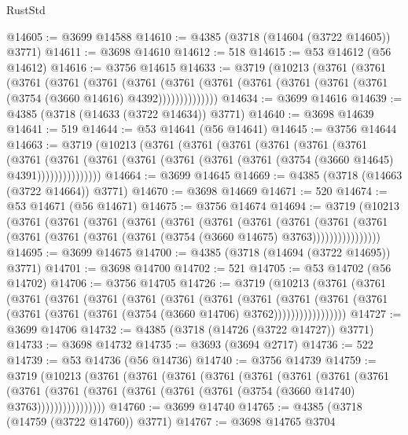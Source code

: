 \begin{lexlean}{RustStd}
\begin{coremodule}
{\begin{coremodule}
{{{{{{{{{{{{{{{{{{{{{{{{{{{{{{{{{{{{{{{{{{{{{{{@14605 := @3699 @14588
@14610 := @4385 (@3718 (@14604 (@3722 @14605)) @3771)
@14611 := @3698 @14610
@14612 := 518
@14615 := @53 @14612 (@56 @14612)
@14616 := @3756 @14615
@14633 := @3719
    (@10213
      (@3761
        (@3761
          (@3761
            (@3761
              (@3761
                (@3761
                  (@3761
                    (@3761 (@3761 (@3761 (@3761 (@3761 (@3754 (@3660 @14616) @4392))))))))))))))
@14634 := @3699 @14616
@14639 := @4385 (@3718 (@14633 (@3722 @14634)) @3771)
@14640 := @3698 @14639
@14641 := 519
@14644 := @53 @14641 (@56 @14641)
@14645 := @3756 @14644
@14663 := @3719
    (@10213
      (@3761
        (@3761
          (@3761
            (@3761
              (@3761
                (@3761
                  (@3761
                    (@3761
                      (@3761 (@3761 (@3761 (@3761 (@3761 (@3754 (@3660 @14645) @4391)))))))))))))))
@14664 := @3699 @14645
@14669 := @4385 (@3718 (@14663 (@3722 @14664)) @3771)
@14670 := @3698 @14669
@14671 := 520
@14674 := @53 @14671 (@56 @14671)
@14675 := @3756 @14674
@14694 := @3719
    (@10213
      (@3761
        (@3761
          (@3761
            (@3761
              (@3761
                (@3761
                  (@3761
                    (@3761
                      (@3761
                        (@3761
                          (@3761 (@3761 (@3761 (@3761 (@3754 (@3660 @14675) @3763))))))))))))))))
@14695 := @3699 @14675
@14700 := @4385 (@3718 (@14694 (@3722 @14695)) @3771)
@14701 := @3698 @14700
@14702 := 521
@14705 := @53 @14702 (@56 @14702)
@14706 := @3756 @14705
@14726 := @3719
    (@10213
      (@3761
        (@3761
          (@3761
            (@3761
              (@3761
                (@3761
                  (@3761
                    (@3761
                      (@3761
                        (@3761
                          (@3761
                            (@3761 (@3761 (@3761 (@3761 (@3754 (@3660 @14706) @3762)))))))))))))))))
@14727 := @3699 @14706
@14732 := @4385 (@3718 (@14726 (@3722 @14727)) @3771)
@14733 := @3698 @14732
@14735 := @3693 (@3694 @2717)
@14736 := 522
@14739 := @53 @14736 (@56 @14736)
@14740 := @3756 @14739
@14759 := @3719
    (@10213
      (@3761
        (@3761
          (@3761
            (@3761
              (@3761
                (@3761
                  (@3761
                    (@3761
                      (@3761
                        (@3761
                          (@3761 (@3761 (@3761 (@3761 (@3754 (@3660 @14740) @3763))))))))))))))))
@14760 := @3699 @14740
@14765 := @4385 (@3718 (@14759 (@3722 @14760)) @3771)
@14767 := @3698 @14765 @3704
}}}}}}}}}}}}}}}}}}}}}}}}}}}}}}}}}}}}}}}}}}}}}}}
\end{coremodule}}
\end{coremodule}
\end{lexlean}
